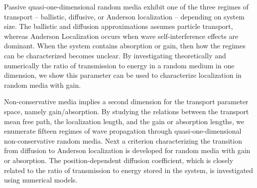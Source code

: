 Passive quasi-one-dimensional random media exhibit one of the three regimes of transport -- ballistic, diffusive, or Anderson localization -- depending on system size. The ballistic and diffusion approximations assumes particle transport, whereas Anderson Localization occurs when wave self-interference effects are dominant. When the system contains absorption or gain, then how the regimes can be characterized becomes unclear. By investigating theoretically and numerically the ratio of transmission to energy in a random medium in one dimension, we show this parameter can be used to characterize localization in random media with gain. 

Non-conservative media implies a second dimension for the transport parameter space, namely gain/absorption. By studying the relations between the transport mean free path, the localization length, and the gain or absorption lengths, we enumerate fifteen regimes of wave propagation through quasi-one-dimensional non-conservative random media. Next a criterion characterizing the transition from diffusion to Anderson localization is developed for random media with gain or absorption. The position-dependent diffusion coefficient, which is closely related to the ratio of transmission to energy stored in the system, is investigated using numerical models.
